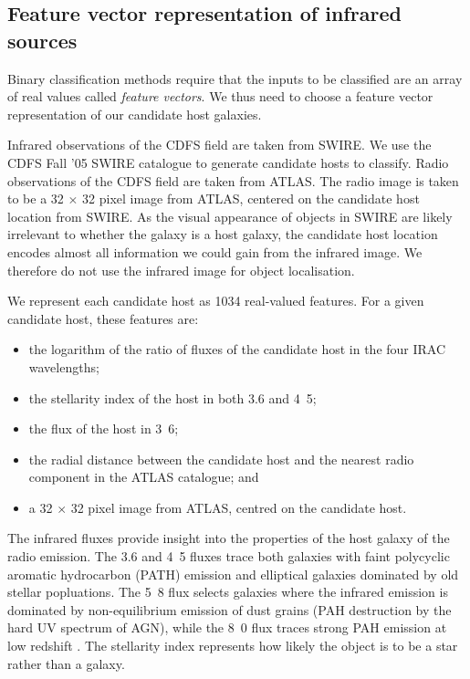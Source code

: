 \documentclass[fleqn,usenatbib,usedcolumn]{mnras}
\begin{document}
  \subsection{Feature vector representation of infrared sources}
  \label{vector-representation-of-infrared-sources}

    Binary classification methods require that the inputs to be classified
    are an array of real values called \emph{feature vectors}. We thus need to
    choose a feature vector representation of our candidate host galaxies.

    Infrared observations of the CDFS field are taken from SWIRE. We use the
    CDFS Fall '05 SWIRE catalogue \citep{surace05swire} to generate candidate
    hosts to classify. Radio observations of the CDFS field are taken from
    ATLAS. The radio image is taken to be a 32 $\times$ 32 pixel image from
    ATLAS, centered on the candidate host location from SWIRE.
    As the visual appearance of objects in SWIRE are likely irrelevant to
    whether the galaxy is a host galaxy, the candidate host location encodes
    almost all information we could gain from the infrared image. We therefore
    do not use the infrared image for object localisation.

    We represent each candidate host as 1034 real-valued features. For a given
    candidate host, these features are:
    \begin{itemize}
      \item the logarithm of the ratio of fluxes of the candidate host in the
        four IRAC wavelengths;
      \item the stellarity index of the host in both 3.6 and
        \unit{4.5}{\micro\meter};
      \item the flux of the host in \unit{3.6}{\micro\meter};
      \item the radial distance between the candidate host and the nearest
        radio component in the ATLAS catalogue; and
      \item a 32 $\times$ 32 pixel image from ATLAS, centred on the candidate
        host.
    \end{itemize}

    The infrared fluxes provide insight into the properties of the host galaxy
    of the radio emission. The 3.6 and \unit{4.5}{\micro\meter} fluxes trace
    both galaxies with faint polycyclic aromatic hydrocarbon (PATH) emission and
    elliptical galaxies dominated by old stellar popluations. The
    \unit{5.8}{\micro\meter} flux selects galaxies where the infrared emission
    is dominated by non-equilibrium emission of dust grains (PAH destruction
    by the hard UV spectrum of AGN), while the \unit{8.0}{\micro\meter} flux
    traces strong PAH emission at low redshift \citep{Sajina2005}.
    The stellarity index represents how likely the object is to be a star
    rather than a galaxy.
\end{document}
